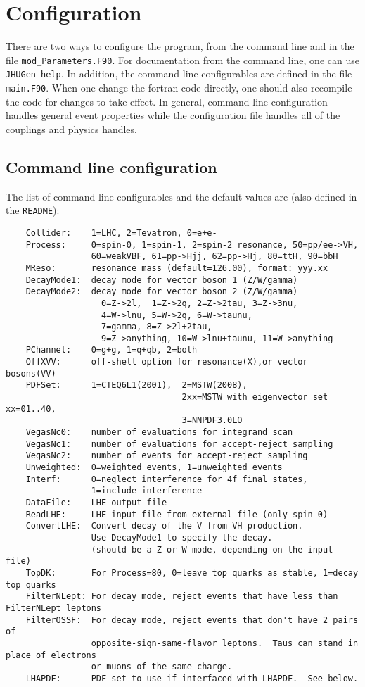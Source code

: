 \documentclass[aps,superscriptaddress,nofootinbib]{revtex4}
\begin{document}
\section{ Configuration }

There are two ways to configure the program, from the command line and in the file \verb|mod_Parameters.F90|.  For documentation from the command line, one can use \verb|JHUGen help|.  In addition, the command line configurables are defined in the file \verb|main.F90|.  When one change the fortran code directly, one should also recompile the code for changes to take effect.  In general, command-line configuration handles general event properties while the configuration file handles all of the couplings and physics handles.

\subsection{ Command line configuration }

The list of command line configurables and the default values are (also defined in the \verb|README|):

\begin{verbatim}
    Collider:    1=LHC, 2=Tevatron, 0=e+e-
    Process:     0=spin-0, 1=spin-1, 2=spin-2 resonance, 50=pp/ee->VH,
                 60=weakVBF, 61=pp->Hjj, 62=pp->Hj, 80=ttH, 90=bbH
    MReso:       resonance mass (default=126.00), format: yyy.xx
    DecayMode1:  decay mode for vector boson 1 (Z/W/gamma)
    DecayMode2:  decay mode for vector boson 2 (Z/W/gamma)
                   0=Z->2l,  1=Z->2q, 2=Z->2tau, 3=Z->3nu,
                   4=W->lnu, 5=W->2q, 6=W->taunu,
                   7=gamma, 8=Z->2l+2tau,
                   9=Z->anything, 10=W->lnu+taunu, 11=W->anything
    PChannel:    0=g+g, 1=q+qb, 2=both
    OffXVV:      off-shell option for resonance(X),or vector bosons(VV)
    PDFSet:      1=CTEQ6L1(2001),  2=MSTW(2008),
                                   2xx=MSTW with eigenvector set xx=01..40,
                                   3=NNPDF3.0LO
    VegasNc0:    number of evaluations for integrand scan
    VegasNc1:    number of evaluations for accept-reject sampling
    VegasNc2:    number of events for accept-reject sampling
    Unweighted:  0=weighted events, 1=unweighted events
    Interf:      0=neglect interference for 4f final states,
                 1=include interference
    DataFile:    LHE output file
    ReadLHE:     LHE input file from external file (only spin-0)
    ConvertLHE:  Convert decay of the V from VH production.
                 Use DecayMode1 to specify the decay.
                 (should be a Z or W mode, depending on the input file)
    TopDK:       For Process=80, 0=leave top quarks as stable, 1=decay top quarks
    FilterNLept: For decay mode, reject events that have less than FilterNLept leptons
    FilterOSSF:  For decay mode, reject events that don't have 2 pairs of
                 opposite-sign-same-flavor leptons.  Taus can stand in place of electrons
                 or muons of the same charge.
    LHAPDF:      PDF set to use if interfaced with LHAPDF.  See below.
\end{verbatim}
\end{document}
